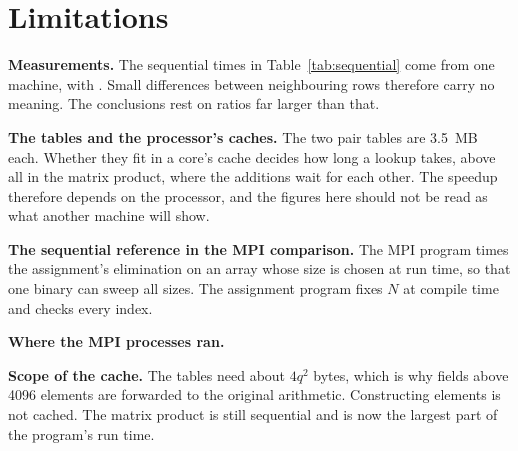 \section{Limitations}
\label{sec:limitations}

\textbf{Measurements.} The sequential times in Table~\ref{tab:sequential} come from one
machine, with \SeqRunsPhrase. \SeqRepeatSentence{} Small differences between neighbouring
rows therefore carry no meaning. The conclusions rest on ratios far larger than that.
\MpiNoiseSentence

\textbf{The tables and the processor's caches.} The two pair tables are 3.5~MB each. Whether
they fit in a core's cache decides how long a lookup takes, above all in the matrix product,
where the additions wait for each other. The speedup therefore depends on the processor, and
the figures here should not be read as what another machine will show.

\textbf{The sequential reference in the MPI comparison.} The MPI program times the
assignment's elimination on an array whose size is chosen at run time, so that one binary
can sweep all sizes. The assignment program fixes $N$ at compile time and checks every
index. \MpiReferenceSentence

\textbf{Where the MPI processes ran.} \MpiNodesLimitation

\textbf{Scope of the cache.} The tables need about $4q^2$ bytes, which is why fields above 4096
elements are forwarded to the original arithmetic. Constructing elements is not cached. The
matrix product is still sequential and is now the largest part of the program's run time.
